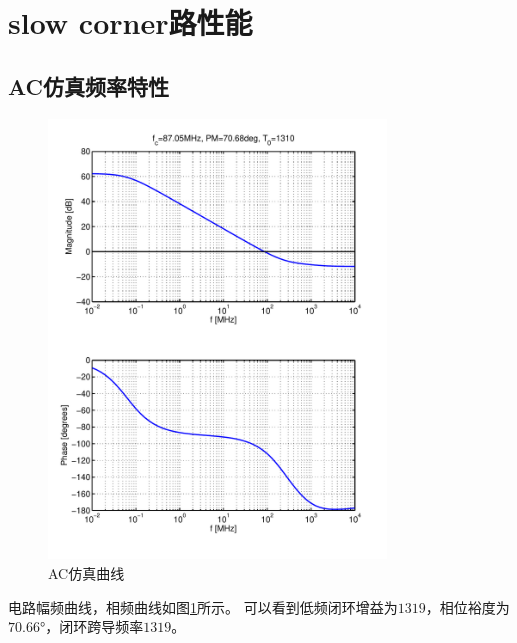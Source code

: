 \documentclass[a4paper]{article}
\newcommand{\udeg}{\si{\degree}}
\begin{document}

\clearpage
\newpage

\section{slow corner路性能}
\subsection{AC仿真频率特性}
\begin{figure}[htb]
    \begin{center}
        \includegraphics[width=0.8\textwidth]{slow/ac.pdf}
    \end{center}
    \caption{AC仿真曲线}
    \label{slowac}
\end{figure}
电路幅频曲线，相频曲线如图\ref{slowac}所示。
可以看到低频闭环增益为$1319$，相位裕度为$70.66\udeg$，闭环跨导频率$1319$。
\newpage
\clearpage
\end{document}
